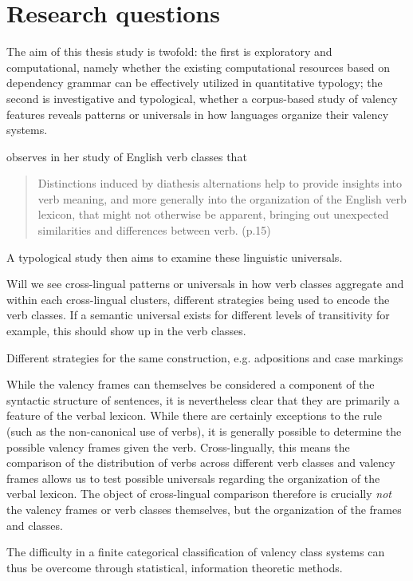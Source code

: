 \section{Research questions}\label{sec:rqs}

The aim of this thesis study is twofold: the first is exploratory and computational, namely whether the existing computational resources based on dependency grammar can be effectively utilized in quantitative typology; the second is investigative and typological, whether a corpus-based study of valency features reveals patterns or universals in how languages organize their valency systems.

\citet{levin1993} observes in her study of English verb classes that
\begin{quote}
    Distinctions induced by diathesis alternations help to provide insights into verb meaning, and more generally into the organization of the English verb lexicon, that might not otherwise be apparent, bringing out unexpected similarities and differences between verb. (p.15)
\end{quote}

A typological study then aims to examine these linguistic universals.

Will we see cross-lingual patterns or universals in how verb classes aggregate and within each cross-lingual clusters, different strategies being used to encode the verb classes. If a semantic universal exists for different levels of transitivity for example, this should show up in the verb classes.

Different strategies for the same construction, e.g. adpositions and case markings

While the valency frames can themselves be considered a component of the syntactic structure of sentences, it is nevertheless clear that they are primarily a feature of the verbal lexicon. While there are certainly exceptions to the rule (such as the non-canonical use of verbs), it is generally possible to determine the possible valency frames given the verb. Cross-lingually, this means the comparison of the distribution of verbs across different verb classes and valency frames allows us to test possible universals regarding the organization of the verbal lexicon. The object of cross-lingual comparison therefore is crucially \textit{not} the valency frames or verb classes themselves, but the organization of the frames and classes.

The difficulty in a finite categorical classification of valency class systems can thus be overcome through statistical, information theoretic methods.
